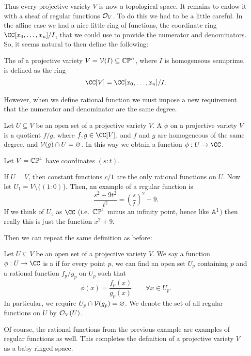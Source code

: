 \documentclass[11pt]{scrreprt}
\begin{document}
Thus every projective variety $V$ is now a topological space.
It remains to endow it with a sheaf of regular functions $\mathcal O_V$.
To do this we had to be a little careful.
In the affine case we had a nice little ring of functions,
the coordinate ring $\CC[x_0,\dots,x_n] / I$,
that we could use to provide the numerator and denominators.
So, it seems natural to then define the following:
\begin{definition}
	The  of a projective variety
	$V = \mathcal V(I) \subseteq \mathbb{CP}^n$, where $I$ is homogeneous semiprime,
	is defined as the ring
	\[ \CC[V] = \CC[x_0, \dots, x_n] / I. \]
\end{definition}
However, when we define rational function we must impose
a new requirement that the numerator and denominator are the same degree.
\begin{definition}
	Let $U \subseteq V$ be an open set of a projective variety $V$.
	A  $\phi$ on a projective variety $V$
	is a quotient $f/g$, where $f,g \in \CC[V]$,
	and $f$ and $g$ are homogeneous of the same degree,
	and $\mathcal V(g) \cap U = \varnothing$.
	In this way we obtain a function $\phi : U \to \CC$.
\end{definition}
\begin{example}
	Let $V = \mathbb{CP}^1$ have coordinates $(s:t)$.
	\begin{enumerate}[(a)]
		\ii If $U = V$, then constant functions $c/1$
		are the only rational functions on $U$.
		\ii Now let $U_1 = V \setminus \{(1:0)\}$.
		Then, an example of a regular function is
		\[ \frac{s^2+9t^2}{t^2} = \left( \frac st \right)^2 + 9. \]
		If we think of $U_1$ as $\CC$
		(i.e.\ $\mathbb{CP}^1$ minus an infinity point, hence like $\mathbb A^1$)
		then really this is just the function $x^2+9$.
	\end{enumerate}
\end{example}
Then we can repeat the same definition as before:
\begin{definition}
	Let $U \subseteq V$ be an open set of a projective variety $V$.
	We say a function $\phi : U \to \CC$ is a  if
	for every point $p$, we can find an open set $U_p$ containing $p$
	and a rational function $f_p/g_p$ on $U_p$ such that
	\[ \phi(x) = \frac{f_p(x)}{g_p(x)} \qquad \forall x \in U_p. \]
	In particular, we require $U_p \cap \mathcal V(g_p) = \varnothing$.
	We denote the set of all regular functions on $U$ by $\mathcal O_V(U)$.
\end{definition}
Of course, the rational functions from the previous example
are examples of regular functions as well.
This completes the definition of a projective variety $V$
as a baby ringed space.
\end{document}
